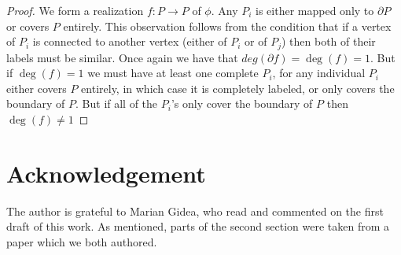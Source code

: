 \documentclass[11pt]{amsart}
\theoremstyle{definition}
\theoremstyle{remark}
\numberwithin{equation}{section}
\theoremstyle{definition}
\begin{document}
	\begin{proof}
		We form a realization $f: P \to P$ of $\phi$. Any $P_i$ is either mapped only to $\partial P$ or covers $P$ entirely. This observation follows from the condition that if a vertex of $P_i$ is connected to another vertex (either of $P_i$ or of $P_j$) then both of their labels must be similar. Once again we have that $deg(\partial f)  =   \deg(f) = 1$. But if $\deg(f) = 1$ we must have at least one complete $P_i$, for any individual $P_i$ either covers $P$ entirely, in which case it is completely labeled, or only covers the boundary of $P$. But if all of the $P_i$'s only cover the boundary of $P$ then $   \deg(f) \not = 1$
		
	\end{proof}
	
	
	
	\section*{Acknowledgement}
	
	The author is grateful to Marian Gidea, who read and commented on the first draft of this work. As mentioned, parts of the second section were taken from a paper which we both authored.  
	
	
	
	
	
	
	
	
	
\end{document}

